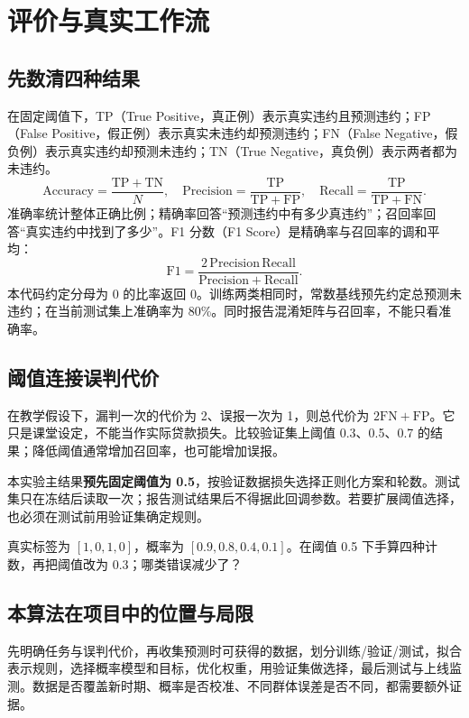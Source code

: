 \documentclass[UTF8,a4paper,11pt,fontset=fandol]{ctexart}
\begin{document}
\section{评价与真实工作流}
\subsection{先数清四种结果}
在固定阈值下，TP（True Positive，真正例）表示真实违约且预测违约；FP（False Positive，假正例）表示真实未违约却预测违约；FN（False Negative，假负例）表示真实违约却预测未违约；TN（True Negative，真负例）表示两者都为未违约。
\begin{equation}
\mathrm{Accuracy}=\frac{\mathrm{TP}+\mathrm{TN}}N,\quad
\mathrm{Precision}=\frac{\mathrm{TP}}{\mathrm{TP}+\mathrm{FP}},\quad
\mathrm{Recall}=\frac{\mathrm{TP}}{\mathrm{TP}+\mathrm{FN}}.
\end{equation}
准确率统计整体正确比例；精确率回答“预测违约中有多少真违约”；召回率回答“真实违约中找到了多少”。F1 分数（F1 Score）是精确率与召回率的调和平均：
\begin{equation}
\mathrm{F1}=\frac{2\,\mathrm{Precision}\,\mathrm{Recall}}{\mathrm{Precision}+\mathrm{Recall}}.
\end{equation}
本代码约定分母为 0 的比率返回 0。训练两类相同时，常数基线预先约定总预测未违约；在当前测试集上准确率为 80\%。同时报告混淆矩阵与召回率，不能只看准确率。
\subsection{阈值连接误判代价}
在教学假设下，漏判一次的代价为 2、误报一次为 1，则总代价为 $2\mathrm{FN}+\mathrm{FP}$。它只是课堂设定，不能当作实际贷款损失。比较验证集上阈值 0.3、0.5、0.7 的结果；降低阈值通常增加召回率，也可能增加误报。

本实验主结果\textbf{预先固定阈值为 0.5}，按验证数据损失选择正则化方案和轮数。测试集只在冻结后读取一次；报告测试结果后不得据此回调参数。若要扩展阈值选择，也必须在测试前用验证集确定规则。
\begin{questionbox}[检查点 C7]
真实标签为 $[1,0,1,0]$，概率为 $[0.9,0.8,0.4,0.1]$。在阈值 0.5 下手算四种计数，再把阈值改为 0.3；哪类错误减少了？
\end{questionbox}
\subsection{本算法在项目中的位置与局限}
先明确任务与误判代价，再收集预测时可获得的数据，划分训练/验证/测试，拟合表示规则，选择概率模型和目标，优化权重，用验证集做选择，最后测试与上线监测。数据是否覆盖新时期、概率是否校准、不同群体误差是否不同，都需要额外证据。
\end{document}
